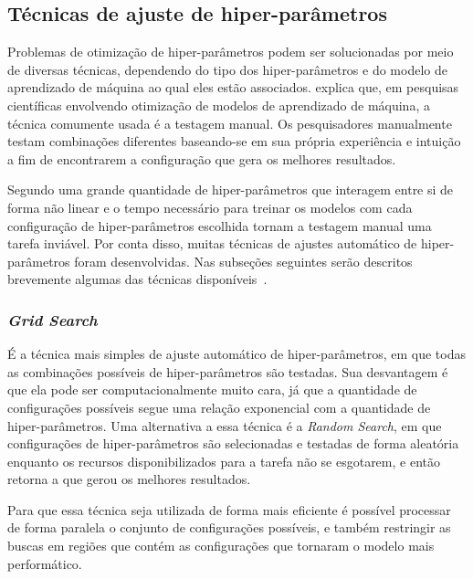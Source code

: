
\subsection{Técnicas de ajuste de hiper-parâmetros}\label{subsec:tecnicas_de_ajuste_de_hps}

Problemas de otimização de hiper-parâmetros podem ser solucionadas por meio de diversas técnicas, dependendo do tipo dos hiper-parâmetros e do modelo de aprendizado de máquina ao qual eles estão associados.  explica que, em pesquisas científicas envolvendo otimização de modelos de aprendizado de máquina, a técnica comumente usada é a testagem manual. Os pesquisadores manualmente testam combinações diferentes baseando-se em sua própria experiência e intuição a fim de encontrarem a configuração que gera os melhores resultados.

Segundo  uma grande quantidade de hiper-parâmetros que interagem entre si de forma não linear e o tempo necessário para treinar os modelos com cada configuração de hiper-parâmetros escolhida tornam a testagem manual uma tarefa inviável. Por conta disso, muitas técnicas de ajustes automático de hiper-parâmetros foram desenvolvidas. Nas subseções seguintes serão descritos brevemente algumas das técnicas disponíveis~\cite{on_hyperparameter_optimization_of_machine_learning_algorithms}.

\subsubsection{\textit{Grid Search}}\label{subsubsec:grid_search}

É a técnica mais simples de ajuste automático de hiper-parâmetros, em que todas as combinações possíveis de hiper-parâmetros são testadas. Sua desvantagem é que ela pode ser computacionalmente muito cara, já que a quantidade de configurações possíveis segue uma relação exponencial com a quantidade de hiper-parâmetros. Uma alternativa a essa técnica é a \textit{Random Search}, em que configurações de hiper-parâmetros são selecionadas e testadas de forma aleatória enquanto os recursos disponibilizados para a tarefa não se esgotarem, e então retorna a que gerou os melhores resultados.

Para que essa técnica seja utilizada de forma mais eficiente é possível processar de forma paralela o conjunto de configurações possíveis, e também restringir as buscas em regiões que contém as configurações que tornaram o modelo mais performático.


